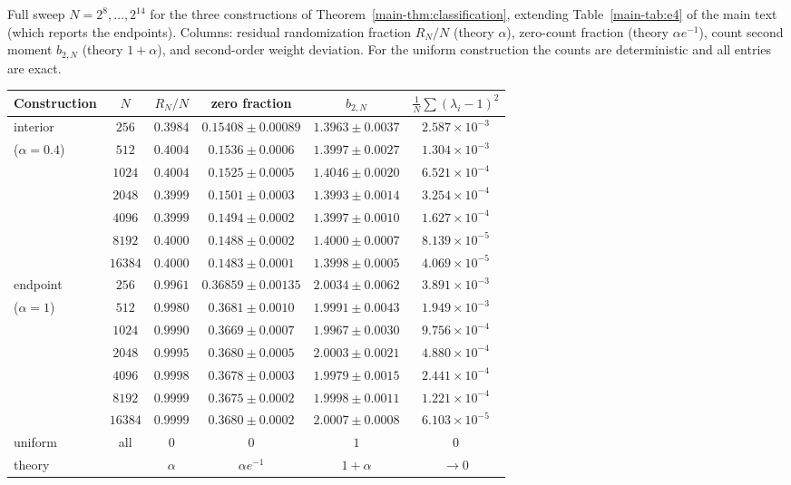 \documentclass[10pt,onecolumn]{IEEEtran}
\theoremstyle{remark}
\begin{document}
Full sweep $N=2^{8},\dots,2^{14}$ for the three constructions of Theorem~\ref{main-thm:classification},
extending Table~\ref{main-tab:e4} of the main text (which reports the endpoints). Columns:
residual randomization fraction $R_N/N$ (theory $\alpha$), zero-count fraction
(theory $\alpha e^{-1}$), count second moment $b_{2,N}$ (theory $1+\alpha$),
and second-order weight deviation. For the uniform construction the counts are
deterministic and all entries are exact.

\begin{center}
\renewcommand{\arraystretch}{1.15}
\begin{tabular}{lccccc}
\toprule
Construction & $N$ & $R_N/N$ & zero fraction & $b_{2,N}$ & $\frac1N\sum(\lambda_i-1)^2$ \\
\midrule
interior & $256$   & $0.3984$ & $0.15408\pm0.00089$ & $1.3963\pm0.0037$ & $2.587\times10^{-3}$ \\
($\alpha=0.4$) & $512$   & $0.4004$ & $0.1536\pm0.0006$ & $1.3997\pm0.0027$ & $1.304\times10^{-3}$ \\
 & $1024$  & $0.4004$ & $0.1525\pm0.0005$ & $1.4046\pm0.0020$ & $6.521\times10^{-4}$ \\
 & $2048$  & $0.3999$ & $0.1501\pm0.0003$ & $1.3993\pm0.0014$ & $3.254\times10^{-4}$ \\
 & $4096$  & $0.3999$ & $0.1494\pm0.0002$ & $1.3997\pm0.0010$ & $1.627\times10^{-4}$ \\
 & $8192$  & $0.4000$ & $0.1488\pm0.0002$ & $1.4000\pm0.0007$ & $8.139\times10^{-5}$ \\
 & $16384$ & $0.4000$ & $0.1483\pm0.0001$ & $1.3998\pm0.0005$ & $4.069\times10^{-5}$ \\
\addlinespace[2pt]
endpoint & $256$   & $0.9961$ & $0.36859\pm0.00135$ & $2.0034\pm0.0062$ & $3.891\times10^{-3}$ \\
($\alpha=1$) & $512$   & $0.9980$ & $0.3681\pm0.0010$ & $1.9991\pm0.0043$ & $1.949\times10^{-3}$ \\
 & $1024$  & $0.9990$ & $0.3669\pm0.0007$ & $1.9967\pm0.0030$ & $9.756\times10^{-4}$ \\
 & $2048$  & $0.9995$ & $0.3680\pm0.0005$ & $2.0003\pm0.0021$ & $4.880\times10^{-4}$ \\
 & $4096$  & $0.9998$ & $0.3678\pm0.0003$ & $1.9979\pm0.0015$ & $2.441\times10^{-4}$ \\
 & $8192$  & $0.9999$ & $0.3675\pm0.0002$ & $1.9998\pm0.0011$ & $1.221\times10^{-4}$ \\
 & $16384$ & $0.9999$ & $0.3680\pm0.0002$ & $2.0007\pm0.0008$ & $6.103\times10^{-5}$ \\
\addlinespace[2pt]
uniform & all & $0$ & $0$ & $1$ & $0$ \\
\midrule
\multicolumn{2}{l}{theory} & $\alpha$ & $\alpha e^{-1}$ & $1+\alpha$ & $\to0$ \\
\bottomrule
\end{tabular}
\end{center}
\end{document}
